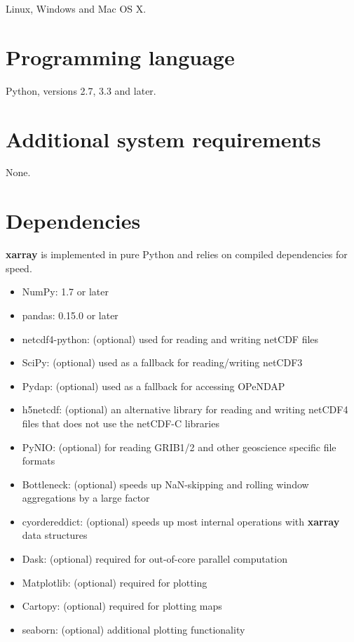 \documentclass{jors}
\begin{document}
Linux, Windows and Mac OS X.

\section*{Programming language}

Python, versions 2.7, 3.3 and later.

\section*{Additional system requirements}

None.

\section*{Dependencies}

\textbf{xarray} is implemented in pure Python and relies on compiled dependencies for
speed.

\begin{itemize}
\item NumPy: 1.7 or later
\item pandas: 0.15.0 or later
\item netcdf4-python: (optional) used for reading and writing netCDF files
\item SciPy: (optional) used as a fallback for reading/writing netCDF3
\item Pydap: (optional) used as a fallback for accessing OPeNDAP
\item h5netcdf: (optional) an alternative library for reading and writing netCDF4 files that does not use the netCDF-C libraries
\item PyNIO: (optional) for reading GRIB1/2 and other geoscience specific file formats
\item Bottleneck: (optional) speeds up NaN-skipping and rolling window aggregations by a large factor
\item cyordereddict: (optional) speeds up most internal operations with \textbf{xarray} data structures
\item Dask: (optional) required for out-of-core parallel computation
\item Matplotlib: (optional) required for plotting
\item Cartopy: (optional) required for plotting maps
\item seaborn: (optional) additional plotting functionality
\end{itemize}
\end{document}

